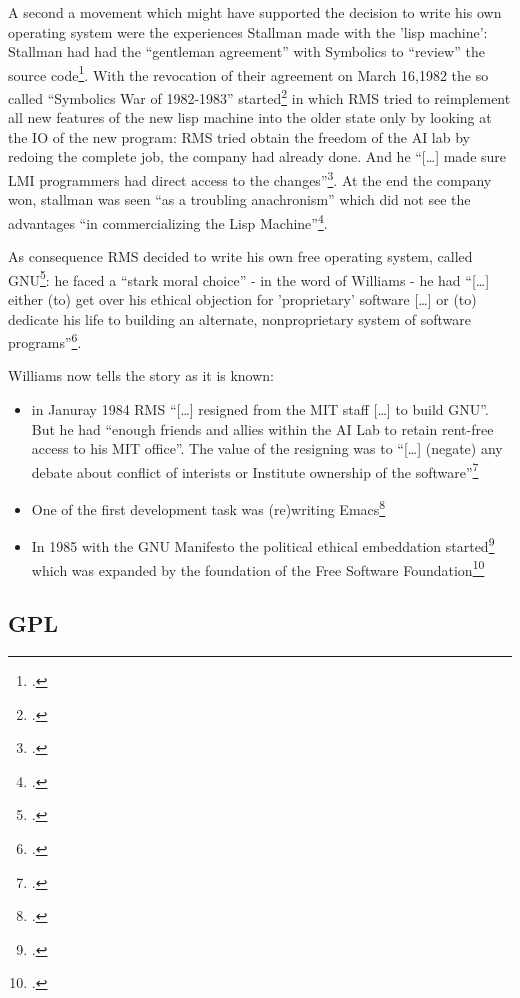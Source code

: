 \documentclass[DIV=calc,BCOR=5mm,11pt,headings=small,oneside,abstract=true, toc=bib]{scrartcl}
\begin{document}
A second a movement which might have supported the decision to write his own
operating system were the experiences Stallman made with the 'lisp machine':
Stallman had had the \enquote{gentleman agreement} with Symbolics to
\enquote{review} the source code\footcite[cf][95]{Williams2002a}. With the
revocation of their agreement on March 16,1982
the so called \enquote{Symbolics War of 1982-1983}
started\footcite[cf][96]{Williams2002a} in which RMS tried to reimplement all
new features of the new lisp machine into the older state only by looking at
the IO of the new program: RMS tried obtain the freedom of the AI lab by redoing
the complete job, the company had already done. And he \enquote{[\ldots] made
sure LMI programmers had direct access to the
changes}\footcite[cf][97]{Williams2002a}. At the end the company won,
stallman was seen \enquote{as a troubling anachronism} which did not see the
advantages \enquote{in commercializing the Lisp
Machine}\footcite[cf][97]{Williams2002a}.

As consequence RMS decided to write his own free operating system, called
GNU\footcite[cf][101]{Williams2002a}: he faced a \enquote{stark moral
choice} - in the word of Williams - he had \enquote{[\ldots] either
(to) get over his ethical objection for 'proprietary' software [\ldots]
or (to) dedicate his life to building an alternate, nonproprietary
system of software programs}\footcite[cf][101]{Williams2002a}.

Williams now tells the story as it is known: 
\begin{itemize}
   \item in Januray 1984 RMS \enquote{[\ldots]
  resigned from the MIT staff [\ldots] to build GNU}. But he had
  \enquote{enough friends and allies within the AI Lab to retain rent-free
  access to his MIT office}. The value of the resigning was to
  \enquote{[\ldots] (negate) any debate about conflict of interists or
  Institute ownership of the software}\footcite[cf][102]{Williams2002a}
  \item One of the first development task was (re)writing
  Emacs\footcite[cf][105]{Williams2002a}
  \item In 1985 with the GNU Manifesto the political ethical embeddation
  started\footcite[cf][105]{Williams2002a} which was expanded by the foundation
  of the Free Software Foundation\footcite[cf][106]{Williams2002a} 
\end{itemize}

\subsection{GPL}
\end{document}
